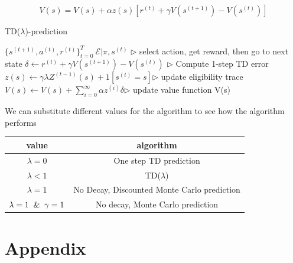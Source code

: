 \documentclass[11pt]{article}
\begin{document}
\begin{equation}
V(s) = V(s) + \alpha z(s) [r^{(t)} + \gamma V(s^{(t+1)}) - V(s^{(t)})]
\end{equation}

\begin{algorithm}[H]
\caption{TD($\lambda$)-prediction}
\label{algo:TDP}
\begin{algorithmic}[1]
\STATE $\{s^{(t+1)}, a^{(t)}, r^{(t)}\}_{t=0}^T ~ \mathcal{E}|\pi,s^{(t)}$ \hfill $\triangleright$ select action, get reward, then go to next state
\STATE $\delta \xleftarrow{} r^{(t)} + \gamma V(s^{(t+1)}) - V(s^{(t)})$ \hfill $\triangleright$ Compute 1-step TD error
\STATE $ z(s) \xleftarrow{} \gamma \lambda Z^(t-1)(s) + 1[s^{(t)} = s]$\hfill $\triangleright$ update eligibility trace
\STATE $V(s) \xleftarrow{} V(s) + \sum_{i=0}^\infty \alpha z^{(i)} \delta$\hfill $\triangleright$ update value function
\ENDFOR
\ENDFOR
\RETURN V(s)
\end{algorithmic}
\end{algorithm}

We can substitute different values for the algorithm to see how the algorithm performs
\begin{center}
\begin{tabular}{||c c||} 
 \hline
 value & algorithm \\ [0.5ex] 
 \hline\hline
 $\lambda = 0$ & One step TD prediction  \\ 
 \hline
 $\lambda < 1$ & TD($\lambda$) \\
 \hline
 $\lambda = 1$ & No Decay, Discounted Monte Carlo prediction \\
 \hline
 $\lambda = 1 \And \gamma = 1$ & No decay, Monte Carlo prediction \\
 \hline
\end{tabular}
\end{center}
\section{Appendix}
\end{document}
